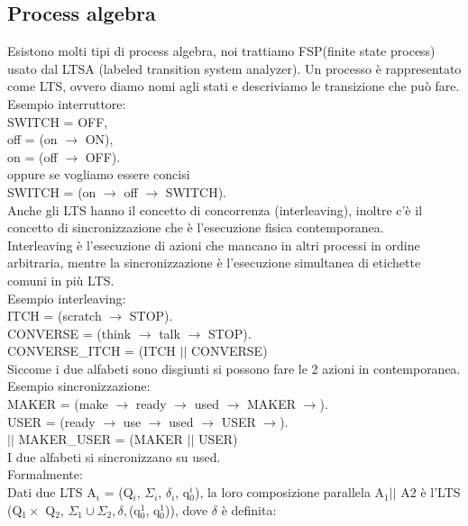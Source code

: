 \documentclass[12pt]{article}
\begin{document}
\subsection{Process algebra} 
Esistono molti tipi di process algebra, noi trattiamo FSP(finite state process) usato dal LTSA (labeled transition system analyzer). Un processo è rappresentato come LTS, ovvero diamo nomi agli stati e descriviamo le transizione che può fare.
\vspace{3mm}
\\ Esempio interruttore: 
\\ SWITCH = OFF, 
\\ off    = (on $\rightarrow$ ON),
\\ on     = (off $\rightarrow$ OFF).
\\ oppure se vogliamo essere concisi 
\\ SWITCH = (on $\rightarrow$ off $\rightarrow$ SWITCH).
\\ Anche gli LTS hanno il concetto di concorrenza (interleaving), inoltre c'è il concetto di sincronizzazione che è l'esecuzione fisica contemporanea. 
\\ Interleaving è l'esecuzione di azioni che mancano in altri processi in ordine arbitraria, mentre la sincronizzazione è l'esecuzione simultanea di etichette comuni in più LTS.
\vspace{3mm}
\\ Esempio interleaving: 
\\ ITCH = (scratch $\rightarrow$ STOP).
\\ CONVERSE = (think $\rightarrow$ talk $\rightarrow$ STOP).
\\ CONVERSE\_ITCH = (ITCH $||$ CONVERSE)
\\ Siccome i due alfabeti sono disgiunti si possono fare le 2 azioni in contemporanea. 
\vspace{3mm} 
\\ Esempio sincronizzazione:
\\ MAKER = (make $\rightarrow$ ready $\rightarrow$ used $\rightarrow$ MAKER $\rightarrow$).
\\ USER = (ready $\rightarrow$ use $\rightarrow$ used $\rightarrow$ USER $\rightarrow$).
\\ $||$ MAKER\_USER = (MAKER $||$ USER)
\\ I due alfabeti si sincronizzano su used.
\\ Formalmente: 
\\ Dati due LTS A$_i$ = (Q$_i$, $\Sigma_i$, $\delta_i$, q$_0^i$), la loro composizione parallela A$_1 ||$ A$2$ è l'LTS (Q$_1 \times$ Q$_2$, $\Sigma_1 \cup \Sigma_2, \delta,$(q$_0^1$, q$_0^1$)), dove $\delta$ è definita:
\end{document}
